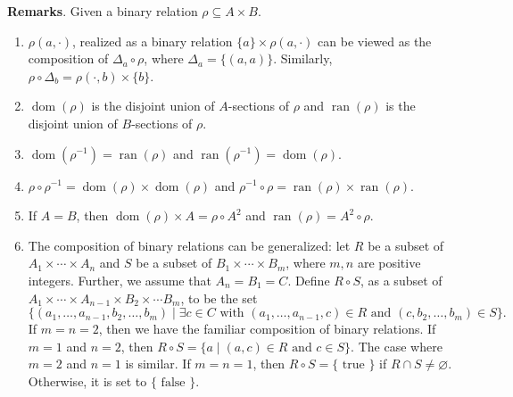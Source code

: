 \documentclass[12pt]{article}
\begin{document}
\textbf{Remarks}.  Given a binary relation $\rho\subseteq A\times B$.
\begin{enumerate}
\item $\rho(a,\cdot)$, realized as a binary relation $\lbrace a\rbrace \times \rho(a,\cdot)$ can be viewed as the composition of $\Delta_a\circ \rho$, where $\Delta_a=\lbrace (a,a)\rbrace$.  Similarly, $\rho\circ \Delta_b=\rho(\cdot,b) \times \lbrace b\rbrace$.
\item $\operatorname{dom}(\rho)$ is the disjoint union of $A$-sections of $\rho$ and $\operatorname{ran}(\rho)$ is the disjoint union of $B$-sections of $\rho$.
\item $\operatorname{dom}(\rho^{-1})=\operatorname{ran}(\rho)$ and $\operatorname{ran}(\rho^{-1})=\operatorname{dom}(\rho)$.
\item $\rho\circ\rho^{-1}=\operatorname{dom}(\rho)\times \operatorname{dom}(\rho)$ and $\rho^{-1}\circ\rho=\operatorname{ran}(\rho)\times \operatorname{ran}(\rho)$.
\item If $A=B$, then $\operatorname{dom}(\rho)\times A=\rho\circ A^2$ and $\operatorname{ran}(\rho) = A^2\circ \rho$.
\item The composition of binary relations can be generalized: let $R$ be a subset of $A_1\times \cdots \times A_n$ and $S$ be a subset of $B_1\times \cdots \times B_m$, where $m,n$ are positive integers.  Further, we assume that $A_n=B_1=C$.  Define $R\circ S$, as a subset of $A_1\times \cdots \times A_{n-1} \times B_2 \times \cdots B_m$, to be the set $$\lbrace (a_1, \ldots, a_{n-1}, b_2, \ldots, b_m) \mid \exists c\in C \mbox{ with }(a_1, \ldots, a_{n-1}, c)\in R\mbox{ and }(c, b_2, \ldots, b_m) \in S\rbrace.$$
If $m=n=2$, then we have the familiar composition of binary relations.  If $m=1$ and $n=2$, then $R\circ S=\lbrace a \mid (a,c)\in R\mbox{ and }c \in S\rbrace$.  The case where $m=2$ and $n=1$ is similar.  If $m=n=1$, then $R\circ S = \lbrace \mbox{ true }\rbrace$ if $R\cap S\ne \varnothing$.  Otherwise, it is set to $\lbrace \mbox{ false }\rbrace$.
\end{enumerate}
\end{document}
